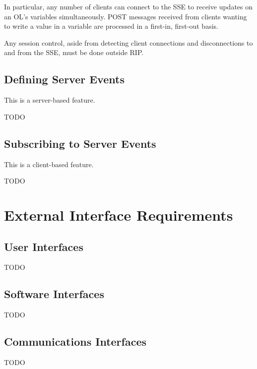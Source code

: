 In particular, any number of clients can connect to the SSE to receive updates on an OL's variables simultaneously. POST messages received from clients wanting to write a value in a variable are processed in a first-in, first-out basis.

Any session control, aside from detecting client connections and disconnections to and from the SSE, must be done outside RIP.

\section{Defining Server Events}
This is a server-based feature. 

TODO

\section{Subscribing to Server Events}
This is a client-based feature. 

TODO


\chapter{External Interface Requirements}
\label{External Interface Requirements}

\section{User Interfaces}
TODO

\section{Software Interfaces}
TODO

\section{Communications Interfaces}
TODO


